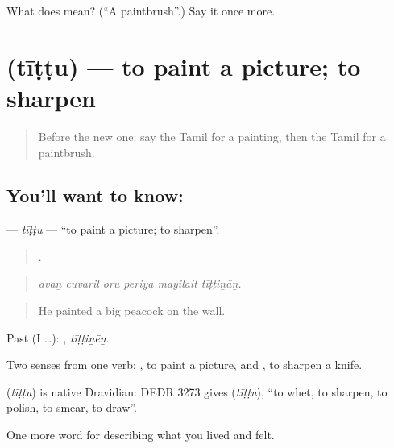 \begin{tcolorbox}[breakable,colback=teal!4,colframe=teal!35!black,title={Before you move on}]
What does  mean? (\textquotedblleft{}A paintbrush\textquotedblright{}.) Say it once more.
\end{tcolorbox}
\section[\texorpdfstring{\ta{தீட்டு} (tīṭṭu)}{தீட்டு (tīṭṭu)}]{ (tīṭṭu) — to paint a picture; to sharpen}

\label{lesson:TA-C536-tittu-paint}



\begin{quote}
Before the new one: say the Tamil for a painting, then the Tamil for a paintbrush.
\end{quote}

\subsection*{You'll want to know: }
\textbf{} — \emph{tīṭṭu} — \textquotedblleft{}to paint a picture; to sharpen\textquotedblright{}.

\begin{quote}
     .
\end{quote}

\begin{quote}
\emph{avaṉ cuvaril oru periya mayilait tīṭṭiṉāṉ.}
\end{quote}

\begin{quote}
He painted a big peacock on the wall.
\end{quote}

Past (I …): , \emph{tīṭṭiṉēṉ}.

Two senses from one verb:  , to paint a picture, and  , to sharpen a knife.

\begin{cousinweb}
\textbf{} (\emph{tīṭṭu}) is native Dravidian: DEDR 3273 gives  (\emph{tīṭṭu}), \textquotedblleft{}to whet, to sharpen, to polish, to smear, to draw\textquotedblright{}.
\end{cousinweb}

\begin{grammarlens}[title={What you've built}]
One more word for describing what you lived and felt.
\end{grammarlens}

